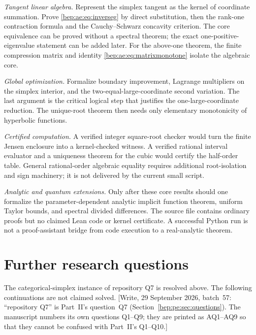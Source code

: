 \documentclass[11pt]{article}
\numberwithin{equation}{section}
\theoremstyle{definition}
\theoremstyle{remark}
\begin{document}
\emph{Tangent linear algebra.} Represent the simplex tangent as the
kernel of coordinate summation. Prove \eqref{bep:ae:eq:inverseg} by direct
substitution, then the rank-one contraction formula and the
Cauchy--Schwarz concavity criterion. The core equivalence can be proved
without a spectral theorem; the exact one-positive-eigenvalue statement
can be added later. For the above-one theorem, the finite compression
matrix and identity \eqref{bep:ae:eq:matrixmonotone} isolate the algebraic core.

\emph{Global optimization.} Formalize boundary improvement, Lagrange
multipliers on the simplex interior, and the two-equal-large-coordinate
second variation. The last argument is the critical logical step that
justifies the one-large-coordinate reduction. The unique-root theorem
then needs only elementary monotonicity of hyperbolic functions.

\emph{Certified computation.} A verified integer square-root checker
would turn the finite Jensen enclosure into a kernel-checked witness.
A verified rational interval evaluator and a uniqueness theorem for the
cubic would certify the half-order table. General rational-order
algebraic equality requires additional root-isolation and sign machinery;
it is not delivered by the current small script.

\emph{Analytic and quantum extensions.} Only after these core results
should one formalize the parameter-dependent analytic implicit function
theorem, uniform Taylor bounds, and spectral divided differences.
The source file contains ordinary proofs but no claimed Lean code or
kernel certificate. A successful Python run is not a proof-assistant
bridge from code execution to a real-analytic theorem.

\section{Further research questions}\label{bep:ae:sec:questions}
The categorical-simplex instance of repository Q7 is resolved above.
The following continuations are not claimed solved.
[Write, 29 September 2026, batch~57: ``repository Q7'' is Part~II's
question~Q7 (Section~\ref{bep:pe:sec:questions}). The manuscript numbers
its own questions Q1--Q9; they are printed as AQ1--AQ9 so that they cannot
be confused with Part~II's Q1--Q10.]
\end{document}
